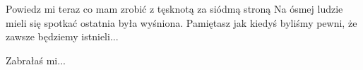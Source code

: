 \documentclass[../../../songbook.tex]{subfiles}
\begin{document}
Powiedz mi teraz co mam zrobić				 \newline
z tęsknotą za siódmą stroną				 \newline
Na ósmej ludzie mieli się spotkać				 \newline
ostatnia była wyśniona.				 \newline
Pamiętasz jak kiedyś byliśmy pewni,				 \newline
że zawsze będziemy istnieli...				 \newline

\-\hspace{1cm} Zabrałaś mi...				 \newline
\end{document}
